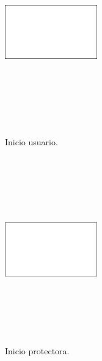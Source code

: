 \documentclass[a4paper, 12pt]{article}
\begin{document}
\begin{figure}[H]
   	\begin{minipage}{0.48\textwidth}
		\begin{center}
			{\includegraphics[height=8cm, width=4cm]{White.png}\par}
			\caption{Inicio usuario.}
			\medskip
			\small

		\end{center}  
	\end{minipage}\hfill
   	\begin{minipage}{0.48\textwidth}
		\begin{center}
			{\includegraphics[height=8cm, width=4cm]{White.png}\par}
			\caption{Inicio protectora.}
			\medskip			
		\end{center}  
	\end{minipage}\hfill
\end{figure}
\end{document}
